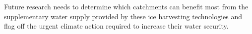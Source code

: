 Future research needs to determine which catchments can benefit most from the supplementary water supply
provided by these ice harvesting technologies and flag off the urgent climate action required to increase their
water security.




